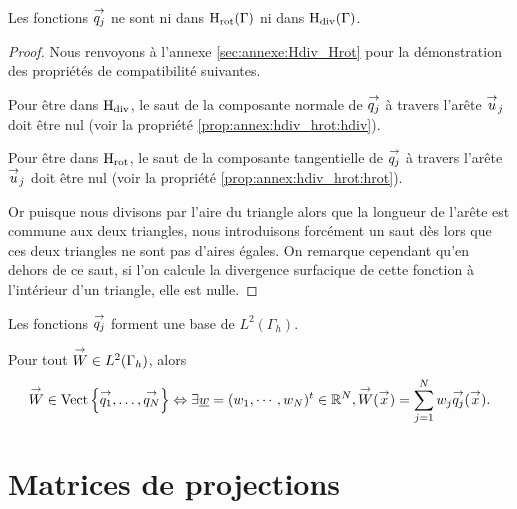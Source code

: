     \FloatBarrier

    \begin{prop}
      Les fonctions \({\overset{\rightarrow}{q_j}}\) ne sont ni dans \(\mathrm{H}_\mathrm{rot}(\Gamma)\) ni dans \(\mathrm{H}_\mathrm{div}(\Gamma)\).
    \end{prop}
    \begin{proof}
      Nous renvoyons à l'annexe \ref{sec:annexe:Hdiv_Hrot} pour la démonstration des propriétés de compatibilité suivantes.

      Pour être dans \(\mathrm{H}_\mathrm{div}\), le saut de la composante normale de \({\overset{\rightarrow}{q_j}}\) à travers l'arête \({\overset{\rightarrow}{u}}_j\) doit être nul (voir la propriété \ref{prop:annex:hdiv_hrot:hdiv}).
      
      Pour être dans \(\mathrm{H}_\mathrm{rot}\), le saut de la composante tangentielle de \({\overset{\rightarrow}{q_j}}\) à travers l'arête \({\overset{\rightarrow}{u}}_j\) doit être nul (voir la propriété \ref{prop:annex:hdiv_hrot:hrot}).

      Or puisque nous divisons par l'aire du triangle alors que la longueur de l'arête est commune aux deux triangles, nous introduisons forcément un saut dès lors que ces deux triangles ne sont pas d'aires égales.
      On remarque cependant qu'en dehors de ce saut, si l'on calcule la divergence surfacique de cette fonction à l'intérieur d'un triangle, elle est nulle.
    \end{proof}

    \begin{prop}
      Les fonctions \({\overset{\rightarrow}{q_j}}\) forment une base de \(L^2(\Gamma_h)\).
    \end{prop}

    \begin{defn}
      Pour tout \({\overset{\rightarrow}{W}} \in L^2(\Gamma_h)\), alors
      \begin{equation*}
        {\overset{\rightarrow}{W}} \in \operatorname{Vect}\left\lbrace{\overset{\rightarrow}{q_1}},\ldots,{\overset{\rightarrow}{q_N}}\right\rbrace \Leftrightarrow \exists {\underline{w}} = (w_1,\cdots,w_N)^t \in \mathbb R^N, {\overset{\rightarrow}{W}}({\overset{\rightarrow}{x}}) = \sum_{j=1}^N w_j {\overset{\rightarrow}{q_j}}({\overset{\rightarrow}{x}}).
      \end{equation*}
    \end{defn}


\section{Matrices de projections}

